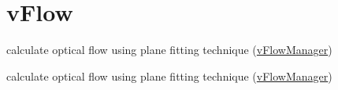 \hypertarget{group__vFlow}{\section{v\-Flow}
\label{group__vFlow}
}


calculate optical flow using plane fitting technique (\hyperlink{classvFlowManager}{v\-Flow\-Manager})  


calculate optical flow using plane fitting technique (\hyperlink{classvFlowManager}{v\-Flow\-Manager}) 